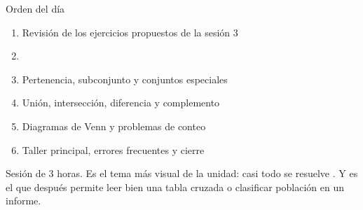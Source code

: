 \documentclass[aspectratio=169,10pt]{beamer}
\begin{document}
\portada

\begin{frame}{Orden del día}
  \begin{enumerate}
    \item Revisión de los ejercicios propuestos de la sesión 3
    \item {}
    \item Pertenencia, subconjunto y conjuntos especiales
    \item Unión, intersección, diferencia y complemento
    \item Diagramas de Venn y problemas de conteo
    \item Taller principal, errores frecuentes y cierre
  \end{enumerate}

  \vspace{0.25cm}
  {\footnotesize\color{uniGris} Sesión de 3 horas. Es el tema más visual de la
  unidad: casi todo se resuelve . Y es el que después
  permite leer bien una tabla cruzada o clasificar población en un informe.}
\end{frame}

\end{document}
